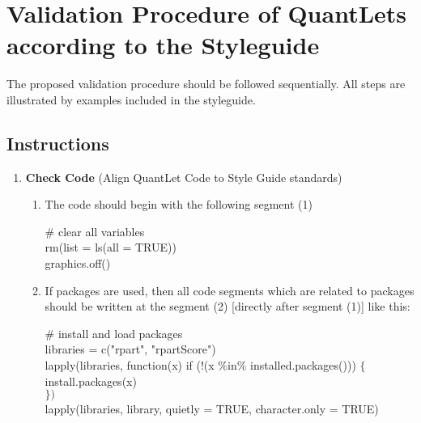 \documentclass{article}
\begin{document}
\section*{Validation Procedure of QuantLets according to the Styleguide}
The proposed validation procedure should be followed sequentially. All steps are illustrated by examples included in the styleguide.

\subsection*{Instructions} %
\begin{enumerate}[label*=\arabic*.]
	\item \textbf{Check Code} (Align QuantLet Code to Style Guide standards) 
	\begin {enumerate}[label*=\arabic*.]
		\item The code should begin with the following segment (1)
			\begin{mdframed}
				{$\#$ clear all variables
				\\rm(list = ls(all = TRUE))
				\\graphics.off() }
			\end{mdframed}												
		\item If packages are used, then all code segments which are related to packages should be written at the segment (2) [directly after segment (1)] like this:
		
				\begin{mdframed} {
					$\#$ install and load packages 
					\\libraries = c("rpart", "rpartScore") 
					\\lapply(libraries, function(x) if (!(x $\%$in$\%$ installed.packages())) $\{$
					\\ \hspace{2cm} install.packages(x)	
					\\ $\})$			
					\\ lapply(libraries, library, quietly = TRUE, character.only = TRUE)}
			\end{mdframed}						
		

\end{enumerate}
\end{enumerate}
\end{document}
